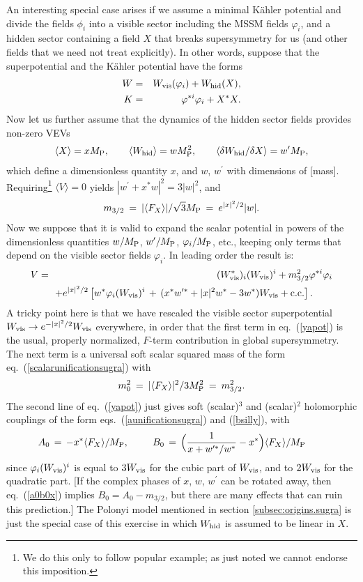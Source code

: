 \documentclass[11pt]{article}
\def\beq{\begin{eqnarray}}
\def\eeq{\end{eqnarray}}
\def\conj{{{\rm c.c.}}}
\def\MPlanck{M_{\rm P}}
\begin{document}
An interesting special case arises if we assume a minimal K\"ahler
potential and divide the fields $\phi_i$ into a visible sector including
the MSSM fields $\varphi_i$, and a hidden sector containing a field $X$
that breaks supersymmetry for us (and other fields that we need not treat
explicitly). In other words, suppose that the superpotential and the
K\"ahler potential 
have the forms
\beq
W &=& W_{\rm vis}(\varphi_i) + W_{\rm hid}(X),
\label{minw}\\
K &=& \varphi^{*i} \varphi_i + X^* X .
\label{mink}
\eeq
Now let us further assume that the dynamics of the hidden sector fields
provides non-zero VEVs
\beq
\langle X \rangle = x \MPlanck,\qquad
\langle W_{\rm hid}\rangle = w \MPlanck^2,\qquad
\langle \delta W_{\rm hid}/\delta X \rangle = w^\prime \MPlanck ,
\eeq
which define a dimensionless quantity $x$, and $w$, $w^\prime$ with 
dimensions of [mass]. Requiring\footnote{We do this only 
to follow popular example; as just 
noted we cannot endorse this imposition.} $\langle V \rangle = 0$ yields $|w^\prime 
+ x^* w|^2 = 3 |w|^2$, and
\beq
m_{3/2} \>=\> {|\langle F_X \rangle |/\sqrt{3} \MPlanck} \>=\> e^{|x|^2/2}|w|.
\eeq
Now we suppose that it is valid to expand the scalar potential in powers
of the dimensionless quantities $w/\MPlanck$, $w^\prime/\MPlanck$,
$\varphi_i/\MPlanck$, etc., keeping only terms that depend on the visible
sector fields $\varphi_i$. In
leading order the result is: 
\beq
V &=& (W^*_{\rm vis})_i (W_{\rm vis})^i + m_{3/2}^2
\varphi^{*i}\varphi_{i}
\nonumber \\ && \!\!
+ e^{|x|^2/2} \left [w^* \varphi_i (W_{\rm vis})^i\, +\,
(x^* w^{\prime *} + |x|^2 w^* - 3 w^*) W_{\rm vis} + \conj \right
].\qquad{}
\label{yapot}
\eeq
A tricky point here is that we have rescaled the visible sector
superpotential $W_{\rm vis} \rightarrow e^{-|x|^2/2} W_{\rm vis}$
everywhere, in order that the first term in eq.~(\ref{yapot}) is the
usual, properly normalized, $F$-term contribution in global supersymmetry.
The next term is a universal soft scalar squared mass of the form
eq.~(\ref{scalarunificationsugra}) with
\beq
m_0^2 \>=\> {|\langle F_X \rangle|^2/ 3 \MPlanck^2}
\>=\> m_{3/2}^2 .
\eeq
The second line of eq.~(\ref{yapot}) just gives soft (scalar)$^3$ and 
(scalar)$^2$ holomorphic couplings of the form
eqs.~(\ref{aunificationsugra}) and (\ref{bsilly}), with
\beq
A_0 \,=\, - x^* {\langle F_X \rangle / \MPlanck},
\qquad\>\>
B_0 \,=\, \Bigl (
{1\over x + w^{\prime *}/w^*} -x^*\Bigr ){\langle F_X \rangle / \MPlanck}
\qquad{}
\label{a0b0x}
\eeq
since $\varphi_i (W_{\rm vis})^i$ is equal to $3 W_{\rm vis}$ for the
cubic part of $W_{\rm vis}$, and to $2 W_{\rm vis}$ for the quadratic
part. [If the complex phases of $x$, $w$, $w^\prime$ can be rotated away,
then eq.~(\ref{a0b0x}) implies $B_0 = A_0 - m_{3/2}$, but there are many
effects that can ruin this prediction.] The Polonyi model mentioned in
section \ref{subsec:origins.sugra} is just the special case of this
exercise in which $W_{\rm hid}$ is assumed to be linear in $X$. 
\end{document}
